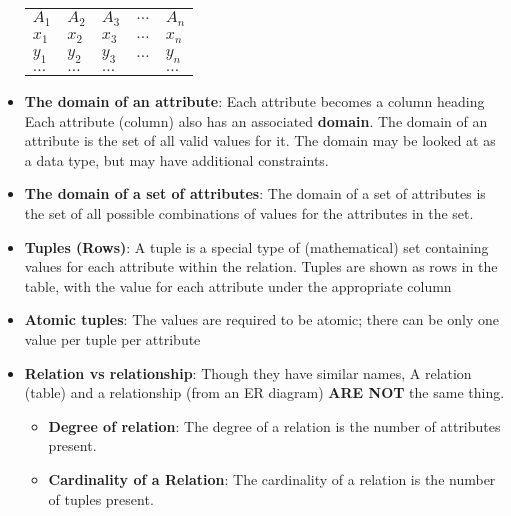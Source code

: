 \documentclass{report}
\begin{document}
\begin{itemize}
            \begin{table}[h!]
                \centering
                \begin{tabular}{|>{\centering\arraybackslash}m{2cm}|>{\centering\arraybackslash}m{2cm}|>{\centering\arraybackslash}m{2cm}|c|>{\centering\arraybackslash}m{2cm}|}
                    \hline
                    \multicolumn{5}{|c|}{\textbf{Relation\_Name}} \\ \hline
                    $A_1$ & $A_2$ & $A_3$ & $\dots$ & $A_n$ \\ \hline
                    $x_1$ & $x_2$ & $x_3$ & $\dots$ & $x_n$ \\ \hline
                    $y_1$ & $y_2$ & $y_3$ & $\dots$ & $y_n$ \\ \hline
                    $\dots$ & $\dots$ & $\dots$ &  & $\dots$ \\ \hline
                \end{tabular}
            \end{table}
        \item \textbf{The domain of an attribute}: Each attribute becomes a column heading
            \bigbreak \noindent 
            Each attribute (column) also has an associated \textbf{domain}. The domain of an attribute is the set of all valid values for it.  The domain may be looked at as a data type, but may have additional constraints.
        \item \textbf{The domain of a set of attributes}: The domain of a set of attributes is the set of all possible combinations of values for the attributes in the set.
        \item \textbf{Tuples (Rows)}: A tuple is a special type of (mathematical) set containing values for each attribute within the relation. Tuples are shown as rows in the table, with the value for each attribute under the appropriate column
        \item \textbf{Atomic tuples}:  The values are required to be atomic; there can be only one value per tuple per attribute
        \item \textbf{Relation vs relationship}: Though they have similar names, A relation (table) and a relationship (from an ER diagram) \textbf{ARE NOT} the same thing.
            \begin{itemize}
                \item \textbf{Degree of relation}: The degree of a relation is the number of attributes present.
                \item \textbf{Cardinality of a Relation}: The cardinality of a relation is the number of tuples present.

\end{itemize}
\end{itemize}
\end{document}
